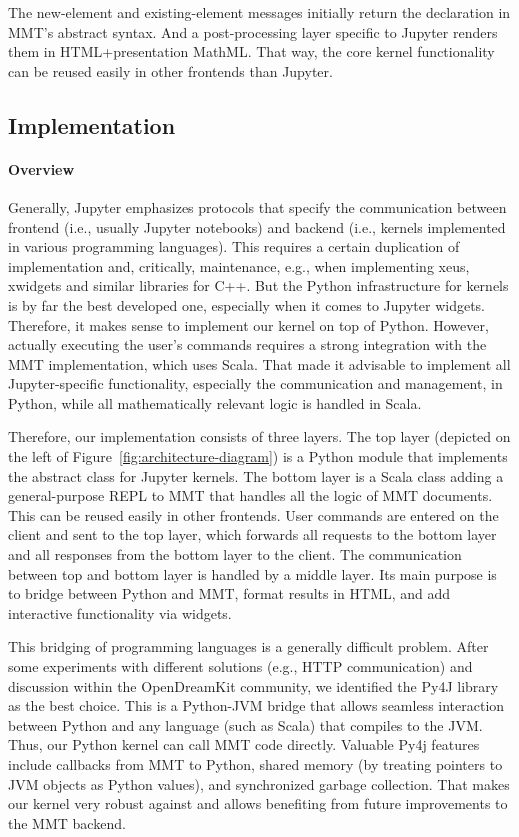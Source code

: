 The new-element and existing-element messages initially return the declaration in MMT's abstract syntax.
And a post-processing layer specific to Jupyter renders them in HTML+presentation MathML.
That way, the core kernel functionality can be reused easily in other frontends than Jupyter.

\subsection{Implementation}\label{sec:kernel:impl}


\paragraph{Overview}
Generally, Jupyter emphasizes protocols that specify the communication between frontend (i.e., usually Jupyter notebooks) and backend (i.e., kernels implemented in various programming languages).
This requires a certain duplication of implementation and, critically, maintenance, e.g., when implementing xeus, xwidgets and similar libraries for C++.
But the Python infrastructure for kernels is by far the best developed one, especially when it comes to Jupyter widgets. 
Therefore, it makes sense to implement our kernel on top of Python.
However, actually executing the user's commands requires a strong integration with the MMT implementation, which uses Scala.
That made it advisable to implement all Jupyter-specific functionality, especially the communication and management, in Python, while all mathematically relevant logic is handled in Scala.

Therefore, our implementation consists of three layers.
The top layer (depicted on the left of Figure~\ref{fig:architecture-diagram}) is a Python module that implements the abstract class for Jupyter kernels.
The bottom layer is a Scala class adding a general-purpose REPL to MMT that handles all the logic of MMT documents.
This can be reused easily in other frontends.
User commands are entered on the client and sent to the top layer, which forwards all requests to the bottom layer and all responses from the bottom layer to the client.
The communication between top and bottom layer is handled by a middle layer.
Its main purpose is to bridge between Python and MMT, format results in HTML, and add interactive functionality via widgets.

This bridging of programming languages is a generally difficult problem.
After some experiments with different solutions (e.g., HTTP communication)  and discussion within the OpenDreamKit community, we identified the Py4J library~\cite{Py4J:on} as the best choice.
This is a Python-JVM bridge that allows seamless interaction between Python and any language (such as Scala) that compiles to the JVM.
Thus, our Python kernel can call MMT code directly.
Valuable Py4j features include callbacks from MMT to Python, shared memory (by treating pointers to JVM objects as Python values), and synchronized garbage collection.
That makes our kernel very robust against  and allows benefiting from future improvements to the MMT backend.


